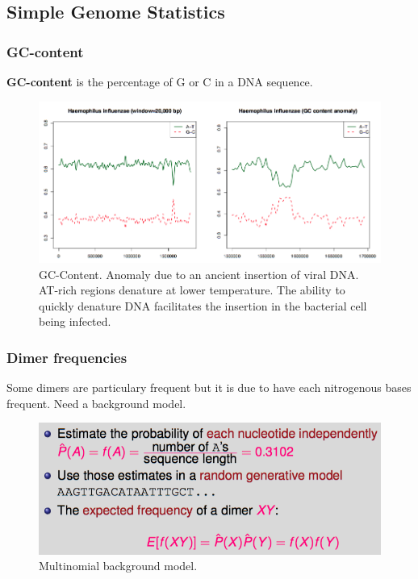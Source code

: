 
\subsection{Simple Genome Statistics}

\subsubsection{GC-content}

\textbf{GC-content} is the percentage of G or C in a DNA sequence.


\begin{figure}[htp]
	\centering
	\includegraphics[scale=0.4]{images/01_gc.png}
 	\caption{GC-Content. Anomaly due to an ancient insertion of viral DNA. AT-rich regions denature at lower temperature. The ability to quickly denature DNA facilitates the insertion in the bacterial cell being infected.}
\end{figure}

\subsubsection{Dimer frequencies}

Some dimers are particulary frequent but it is due to have each nitrogenous bases frequent. Need a background model.

\begin{figure}[htp]
	\centering
	\includegraphics[scale=0.4]{images/02_dimer.png}
 	\caption{Multinomial background model.}
\end{figure}

